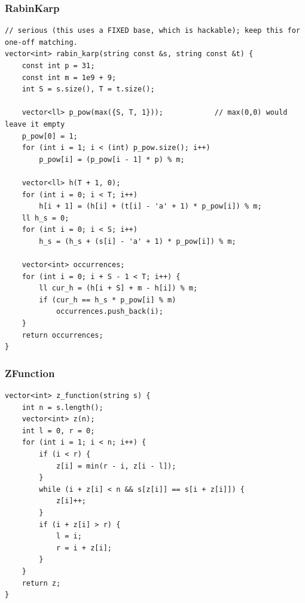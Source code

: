 \documentclass[9pt,a4paper,twocolumn]{extarticle}
\begin{document}
\subsubsection{RabinKarp}
\nopagebreak
\begin{lstlisting}
// serious (this uses a FIXED base, which is hackable); keep this for one-off matching.
vector<int> rabin_karp(string const &s, string const &t) {
    const int p = 31;
    const int m = 1e9 + 9;
    int S = s.size(), T = t.size();

    vector<ll> p_pow(max({S, T, 1}));            // max(0,0) would leave it empty
    p_pow[0] = 1;
    for (int i = 1; i < (int) p_pow.size(); i++)
        p_pow[i] = (p_pow[i - 1] * p) % m;

    vector<ll> h(T + 1, 0);
    for (int i = 0; i < T; i++)
        h[i + 1] = (h[i] + (t[i] - 'a' + 1) * p_pow[i]) % m;
    ll h_s = 0;
    for (int i = 0; i < S; i++)
        h_s = (h_s + (s[i] - 'a' + 1) * p_pow[i]) % m;

    vector<int> occurrences;
    for (int i = 0; i + S - 1 < T; i++) {
        ll cur_h = (h[i + S] + m - h[i]) % m;
        if (cur_h == h_s * p_pow[i] % m)
            occurrences.push_back(i);
    }
    return occurrences;
}
\end{lstlisting}

\filbreak
\subsubsection{ZFunction}
\nopagebreak
\begin{lstlisting}
vector<int> z_function(string s) {
    int n = s.length();
    vector<int> z(n);
    int l = 0, r = 0;
    for (int i = 1; i < n; i++) {
        if (i < r) {
            z[i] = min(r - i, z[i - l]);
        }
        while (i + z[i] < n && s[z[i]] == s[i + z[i]]) {
            z[i]++;
        }
        if (i + z[i] > r) {
            l = i;
            r = i + z[i];
        }
    }
    return z;
}
\end{lstlisting}

\filbreak
\end{document}
